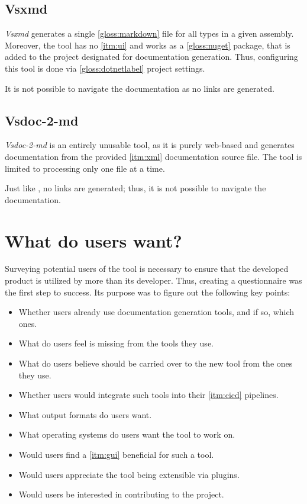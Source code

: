 \subsection{Vsxmd} \label{ssec:vsxmd}

\textit{Vsxmd} generates a single \ref{gloss:markdown} file for all types in a given assembly. Moreover, the tool has no \ref{itm:ui} and works as a \ref{gloss:nuget} package, that is added to the project designated for documentation generation. Thus, configuring this tool is done via \ref{gloss:dotnetlabel} project settings.

It is not possible to navigate the documentation as no links are generated.

\subsection{Vsdoc-2-md}

\textit{Vsdoc-2-md} is an entirely unusable tool, as it is purely web-based and generates documentation from the provided \ref{itm:xml} documentation source file. The tool is limited to processing only one file at a time.

Just like \textit{}, no links are generated; thus, it is not possible to navigate the documentation.

\newpage

\section{What do users want?} \label{sec:whatdouserswant}
Surveying potential users of the tool is necessary to ensure that the developed product is utilized by more than its developer.
Thus, creating a questionnaire was the first step to success. Its purpose was to figure out the following key points:
\begin{itemize}
    \item Whether users already use documentation generation tools, and if so, which ones.
    \item What do users feel is missing from the tools they use.
    \item What do users believe should be carried over to the new tool from the ones they use.
    \item Whether users would integrate such tools into their \ref{itm:cicd} pipelines.
    \item What output formats do users want.
    \item What operating systems do users want the tool to work on.
    \item Would users find a \ref{itm:gui} beneficial for such a tool.
    \item Would users appreciate the tool being extensible via plugins.
    \item Would users be interested in contributing to the project.
\end{itemize}


